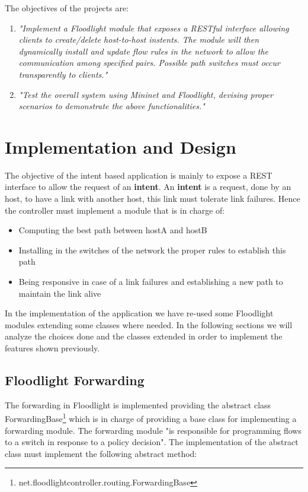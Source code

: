 \documentclass[a4paper]{report}
\begin{document}
	
	\noindent The objectives of the projects are:
	\begin{enumerate}
		\item \textit{"Implement a Floodlight module that exposes a RESTful interface allowing clients to create/delete host-to-host instents. The module will then dynamically install and update flow rules in the network to allow the communication among specified pairs. Possible path switches must occur transparently to clients."}
		
		\item \textit{"Test the overall system using Mininet and Floodlight, devising proper scenarios to demonstrate the above functionalities."}
	\end{enumerate}
	
	
	\chapter{Implementation and Design}
	\noindent The objective of the intent based application is mainly to expose a REST interface to allow the request of an \textbf{intent}. An \textbf{intent} is a request, done by an host, to have a link with another host, this link must tolerate link failures.
	\noindent Hence the controller must implement a module that is in charge of:
	\begin{itemize}
		\item Computing the best path between hostA and hostB
		\item Installing in the switches of the network the proper rules to establish this path
		\item Being responsive in case of a link failures and establishing a new path to maintain the link alive
	\end{itemize}
	\noindent In the implementation of the application we have re-used some Floodlight modules extending some classes where needed. In the following sections we will analyze the choices done and the classes extended in order to implement the features shown previously.
	
	\section{Floodlight Forwarding}
	\noindent The forwarding in Floodlight is implemented providing the abstract class ForwardingBase\footnote{net.floodlightcontroller.routing.ForwardingBase} which is in charge of providing a base class for implementing a forwarding module. The forwarding module "is responsible for programming flows to a switch in response to a policy decision". The implementation of the abstract class must implement the following abstract method:
	
\end{document}
